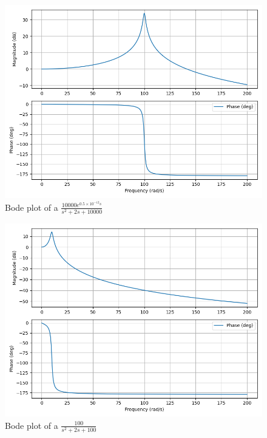 \documentclass[journal,12pt,onecolumn]{IEEEtran}
\theoremstyle{remark}
\begin{document}
\begin{figure}[h]
    \centering
    \includegraphics[width=\linewidth]{figs/C.png}
    \caption{Bode plot of a $\frac{10000e^{0.5\times10^{-12}s}}{s^2+2s+10000}$}
\end{figure}
\begin{figure}[h]
    \centering
    \includegraphics[width=\linewidth]{figs/D.png}
    \caption{Bode plot of a $\frac{100}{s^2+2s+100}$}
\end{figure}
\end{document}
